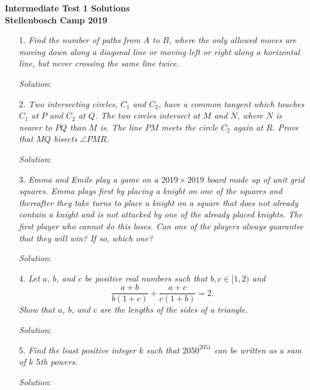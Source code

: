 \documentclass{article}
\begin{document}
\begin{center}
  \textbf{\Large Intermediate Test 1 Solutions}
  \\ \vspace{1em}
  \textbf{\large Stellenbosch Camp 2019}
\end{center}


\begin{enumerate}[1.]

\item[1.] %
\textit{Find the number of paths from $A$ to $B$, where the only allowed moves are moving down along a diagonal line or moving left or right along a horizontal line, but never crossing the same line twice.}

\textit{Solution}:
\vspace{6.81mm}

\item[2.] %
\textit{Two intersecting circles, $C_1$ and $C_2$, have a common tangent which touches $C_1$ at $P$ and $C_2$ at $Q$. The two circles intersect at $M$ and $N$, where $N$ is nearer to $PQ$ than $M$ is. The line $PM$ meets the circle $C_2$ again at $R$. Prove that $MQ$ bisects $\angle PMR$.}

\textit{Solution}:
\vspace{6.81mm}

\item[3.] %
\textit{Emma and Emile play a game on a $2019 \times 2019$ board made up of unit grid squares. Emma plays first by placing a knight on one of the squares and thereafter they take turns to place a knight on a square that does not already contain a knight and is not attacked by one of the already placed knights. The first player who cannot do this loses. Can one of the players always guarantee that they will win? If so, which one? }

\textit{Solution}:
\vspace{6.81mm}

\item[4.] %
\textit{Let $a$, $b$, and $c$ be positive real numbers such that $b, c \in [1,2)$ and
\[ \frac{a+b}{b(1+c)} +\frac{a+c}{c(1+b)} = 2. \]
Show that $a$, $b$, and $c$ are the lengths of the sides of a triangle.}

\textit{Solution}:
\vspace{6.81mm}

\item[5.] %
\textit{Find the least positive integer $k$ such that $2050^{2051}$ can be written as a sum of $k$ $5$th powers.}

\textit{Solution}: 


\end{enumerate}
\end{document}
